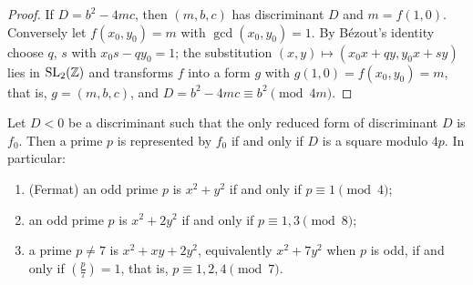 \begin{proof}
If $D = b^2 - 4mc$, then $(m, b, c)$ has discriminant $D$ and $m = f(1, 0)$. Conversely let $f(x_0, y_0) = m$ with $\gcd(x_0, y_0) = 1$. By B\'ezout's identity choose $q$, $s$ with $x_0s - qy_0 = 1$; the
substitution $(x, y) \mapsto (x_0x + qy, y_0x + sy)$ lies in $\mathrm{SL}_2(\mathbb{Z})$ and transforms $f$ into a form $g$ with $g(1, 0) = f(x_0, y_0) = m$, that is, $g = (m, b, c)$, and $D = b^2 - 4mc \equiv b^2 \pmod{4m}$.
\end{proof}

\begin{corollary}\label{number-theory:corollary-class-number-one}
Let $D < 0$ be a discriminant such that the only reduced form of discriminant $D$ is $f_0$. Then a prime $p$ is represented by $f_0$ if and only if $D$ is a square modulo $4p$. In particular:
\begin{enumerate}
\item (Fermat) an odd prime $p$ is $x^2 + y^2$ if and only if $p \equiv 1 \pmod 4$;
\item an odd prime $p$ is $x^2 + 2y^2$ if and only if $p \equiv 1, 3 \pmod 8$;
\item a prime $p \neq 7$ is $x^2 + xy + 2y^2$, equivalently $x^2 + 7y^2$ when $p$ is odd, if and only if $(\frac{p}{7}) = 1$, that is, $p \equiv 1, 2, 4 \pmod 7$.
\end{enumerate}
\end{corollary}

